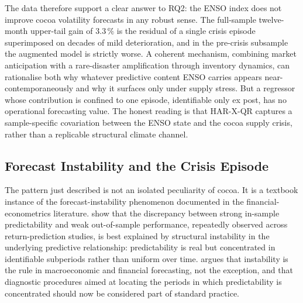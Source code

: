 The data therefore support a clear answer to RQ2: the ENSO index does not
improve cocoa volatility forecasts in any robust sense. The full-sample
twelve-month upper-tail gain of $3.3\,\%$ is the residual of a single
crisis episode superimposed on decades of mild deterioration, and in the
pre-crisis subsample the augmented model is strictly worse. A coherent
mechanism, combining market anticipation with a rare-disaster
amplification through inventory dynamics, can rationalise both why
whatever predictive content ENSO carries appears near-contemporaneously
and why it surfaces only under supply stress. But a regressor whose
contribution is confined to one episode, identifiable only ex post, has
no operational forecasting value. The honest reading is that HAR-X-QR
captures a sample-specific covariation between the ENSO state and the
cocoa supply crisis, rather than a replicable structural climate
channel.

\subsection{Forecast Instability and the Crisis Episode}
\label{sec:disc-instability}

The pattern just described is not an isolated peculiarity of cocoa. It is a
textbook instance of the forecast-instability phenomenon documented in the
financial-econometrics literature. \textcite{payeInstabilityReturnPrediction2006}
show that the discrepancy between strong in-sample predictability and weak
out-of-sample performance, repeatedly observed across return-prediction
studies, is best explained by structural instability in the underlying
predictive relationship: predictability is real but concentrated in
identifiable subperiods rather than uniform over time.
\textcite{rossiForecastingPresenceInstabilities2020} argues that instability
is the rule in macroeconomic and financial forecasting, not the exception,
and that diagnostic procedures aimed at locating the periods in which
predictability is concentrated should now be considered part of standard
practice.

